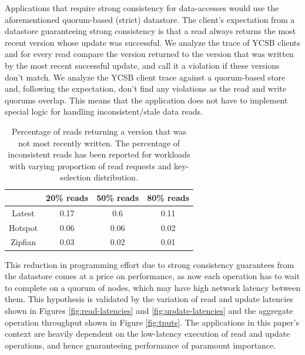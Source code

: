 \par Applications that require strong consistency for data-accesses would use the aforementioned quorum-based (strict) datastore. The client's expectation from a datastore guaranteeing strong consistency is that a read always returns the most recent version whose update was successful. We analyze the trace of YCSB clients and for every read compare the version returned to the version that was written by the most recent successful update, and call it a violation if these versions don't match. We analyze the YCSB client trace against a quorum-based store and, following the expectation, don't find any violations as the read and write quorums overlap. This means that the application does not have to implement special logic for handling inconsistent/stale data reads.
\begin{table}
\centering
\caption{Percentage of reads returning a version that was not most recently written.  The percentage of inconsistent reads has been reported for workloads with varying proportion of read requests and key-selection distribution.}\label{tab:consistency_violations}
\begin{tabular}{ |c|c|c|c| } 
 \hline
 & 20\% reads & 50\% reads & 80\% reads \\ 
 \hline
 Latest & 0.17 & 0.6 & 0.11 \\ 
 \hline
 Hotspot & 0.06 & 0.06 & 0.02 \\ 
 \hline
 Zipfian & 0.03 & 0.02 & 0.01 \\ 
 \hline
\end{tabular}
\end{table}
\par This reduction in programming effort due to strong consistency guarantees from the datastore comes at a price on performance, as now each operation has to wait to complete on a quorum of nodes, which may have high network latency between them. This hypothesis is validated by the variation of read and update latencies shown in Figures \ref{fig:read-latencies} and \ref{fig:update-latencies} and the aggregate operation throughput shown in Figure \ref{fig:tputs}. The applications in this paper's context are heavily dependent on the low-latency execution of read and update operations, and hence guaranteeing performance of paramount importance. 
